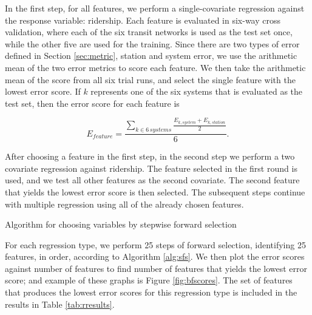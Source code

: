 \documentclass[11pt]{report}
\begin{document}
In the first step, for all features, we perform a single-covariate regression against the response variable: ridership. Each feature is evaluated in six-way cross validation, where each of the six transit networks is used as the test set once, while the other five are used for the training. Since there are two types of error defined in Section \ref{sec:metric}, station and system error, we use the arithmetic mean of the two error metrics to score each feature. We then take the arithmetic mean of the score from all six trial runs, and select the single feature with the lowest error score. If $k$ represents one of the six systems that is evaluated as the test set, then the error score for each feature is

$$ E_{feature} = \displaystyle\frac{\sum\limits_{k\in 6\,systems}\displaystyle\frac{E_{k, system} + E_{k, station}}{2}}{6}.$$

After choosing a feature in the first step, in the second step we perform a two covariate regression against ridership. The feature selected in the first round is used, and we test all other features as the second covariate. The second feature that yields the lowest error score is then selected. The subsequent steps continue with multiple regression using all of the already chosen features. 

\begin{algorithm}\begingroup\fontsize{10}{10}\selectfont
\begin{algorithmic}
	\EndFor
\EndFor
\end{algorithmic}\endgroup\caption{Algorithm for choosing variables by stepwise forward selection}\label{alg:sfs}
\end{algorithm} 

For each regression type, we perform 25 steps of forward selection, identifying 25 features, in order, according to Algorithm \ref{alg:sfs}. We then plot the error scores against number of features to find number of features that yields the lowest error score; and example of these graphs is Figure \ref{fig:bfscores}. The set of features that produces the lowest error scores for this regression type is included in the results in Table \ref{tab:rresults}.
\end{document}
